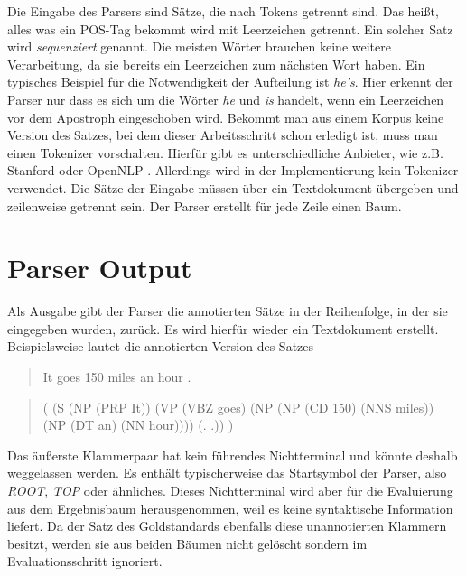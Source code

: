 Die Eingabe des Parsers sind Sätze, die nach Tokens getrennt sind. Das heißt, alles was ein POS-Tag bekommt wird mit Leerzeichen getrennt. Ein solcher Satz wird \textit{sequenziert} genannt. Die meisten Wörter brauchen keine weitere Verarbeitung, da sie bereits ein Leerzeichen zum nächsten Wort haben. Ein typisches Beispiel für die Notwendigkeit der Aufteilung ist \textit{he's}. Hier erkennt der Parser nur dass es sich um die Wörter \textit{he} und \textit{is} handelt, wenn ein Leerzeichen vor dem Apostroph eingeschoben wird. Bekommt man aus einem Korpus keine Version des Satzes, bei dem dieser Arbeitsschritt schon erledigt ist, muss man einen Tokenizer vorschalten. Hierfür gibt es unterschiedliche Anbieter, wie z.B. Stanford \cite{stanfordTokenizer} oder OpenNLP \cite{openNlpManual}. %
Allerdings wird in der Implementierung kein Tokenizer verwendet. Die Sätze der Eingabe müssen über ein Textdokument übergeben und zeilenweise getrennt sein. Der Parser erstellt für jede Zeile einen Baum.

\section{Parser Output}
Als Ausgabe gibt der Parser die annotierten Sätze in der Reihenfolge, in der sie eingegeben wurden, zurück. Es wird hierfür wieder ein Textdokument erstellt. %
Beispielsweise lautet die annotierten Version des Satzes
\begin{quote}
It goes 150 miles an hour .
\end{quote}
\begin{quote}
( (S (NP (PRP It)) (VP (VBZ goes) (NP (NP (CD 150) (NNS miles)) \\(NP (DT an) (NN hour)))) (. .)) )
\end{quote}
Das äußerste Klammerpaar hat kein führendes Nichtterminal und könnte deshalb weggelassen werden. Es enthält typischerweise das Startsymbol der Parser, also \textit{ROOT}, \textit{TOP} oder ähnliches. Dieses Nichtterminal wird aber für die Evaluierung aus dem Ergebnisbaum herausgenommen, weil es keine syntaktische Information liefert. Da der Satz des Goldstandards ebenfalls diese unannotierten Klammern besitzt, werden sie aus beiden Bäumen nicht gelöscht sondern im Evaluationsschritt ignoriert.
